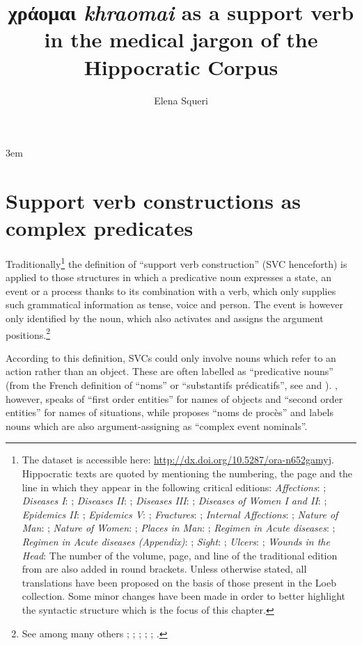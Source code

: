 \documentclass[output=paper,colorlinks,citecolor=brown]{langscibook}
\author{Elena Squeri\affiliation{Sapienza - Università di Roma / UMR 8167: Orient et Méditerranée (équipe Médecine grecque et littérature technique)}}
\title[χράομαι \textit{khraomai} as a support verb in the Hippocratic Corpus]{χράομαι \textit{khraomai} as a support verb in the medical jargon of the Hippocratic Corpus}
\begin{document}
\emergencystretch 3em
\maketitle

\section{Support verb constructions as complex predicates}
Traditionally\footnote{The dataset is accessible here: \url{http://dx.doi.org/10.5287/ora-n652gamyj}. Hippocratic texts are quoted by mentioning the numbering, the page and the line in which they appear in the following critical editions: \textit{Affections}: \citet{PotterDiseases1988}; \textit{Diseases I}: \citet{PotterDiseases1988}; \textit{Diseases II}: \citet{Jouanna1983}; \textit{Diseases III}: \citet{Potter1980}; \textit{Diseases of Women I and II}: \citet{Potter2018}; \textit{Epidemics II}: \citet{Smith1994}; \textit{Epidemics V}: \citet{Jouanna2000}; \textit{Fractures}: \citet{Jouanna2022}; \textit{Internal Affections}: \citet{PotterAffections1988}; \textit{Nature of Man}: \citet{Jouanna2002}; \textit{Nature of Women}: \citet{Bourbon2008};  \textit{Places in Man}: \citet{Joly1978}; \textit{Regimen in Acute diseases}: \citet{Joly1972}; \textit{Regimen in Acute diseases (Appendix)}: \citet{Joly1972}; \textit{Sight}: \citet{Joly1978}; \textit{Ulcers}: \citet{Duminil1998}; \textit{Wounds in the Head}: \citet{Hanson1999} The number of the volume, page, and line of the traditional edition from \citet{Littre1839} are also added in round brackets. Unless otherwise stated, all translations have been proposed on the basis of those present in the Loeb collection. Some minor changes have been made in order to better highlight the syntactic structure which is the focus of this chapter.} the definition of “support verb construction” (SVC henceforth) is applied to those structures in which a predicative noun expresses a state, an event or a process thanks to its combination with a verb, which only supplies such grammatical information as tense, voice and person. The event is however only identified by the noun, which also activates and assigns the argument positions.\footnote{See among many others \citet{Gross1981}; \citet{Gross1989}; \citet{Gross2004}; \citet{Gross2017}; \citet{jezek2004types}; \citet{Langer2005}.}

According to this definition, SVCs could only involve nouns which refer to an action rather than an object. These are often labelled as “predicative nouns” (from the French definition of “noms” or “substantifs prédicatifs”, see \citealt{Gross1981} and \citealt{Gross1989}). \citet{Lyons1977}, however, speaks of “first order entities” for names of objects and “second order entities” for names of situations, while \citet{simone2003masdar} proposes “noms de procès” and \citet[49--54]{Grimshaw1990} labels nouns which are also argument-assigning as “complex event nominals”.
\end{document}
